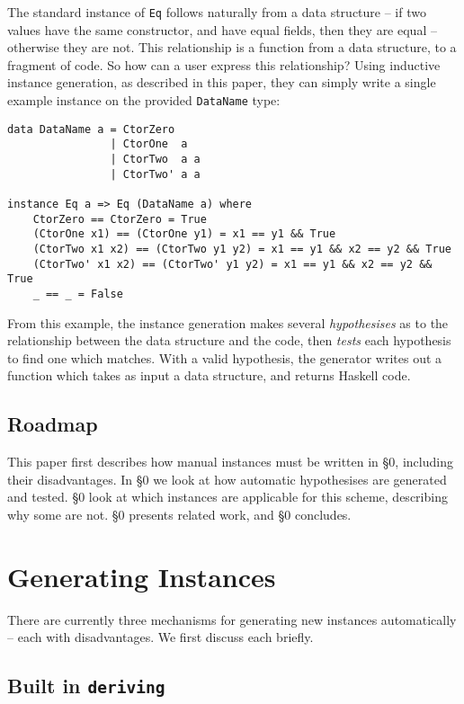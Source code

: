 \documentclass{llncs}
\newcommand{\T}[1]{\texttt{#1}}
\begin{document}
The standard instance of \T{Eq} follows naturally from a data structure -- if two values have the same constructor, and have equal fields, then they are equal -- otherwise they are not. This relationship is a function from a data structure, to a fragment of code. So how can a user express this relationship? Using inductive instance generation, as described in this paper, they can simply write a single example instance on the provided \T{DataName} type:

\begin{verbatim}
data DataName a = CtorZero
                | CtorOne  a
                | CtorTwo  a a
                | CtorTwo' a a

instance Eq a => Eq (DataName a) where
    CtorZero == CtorZero = True
    (CtorOne x1) == (CtorOne y1) = x1 == y1 && True
    (CtorTwo x1 x2) == (CtorTwo y1 y2) = x1 == y1 && x2 == y2 && True
    (CtorTwo' x1 x2) == (CtorTwo' y1 y2) = x1 == y1 && x2 == y2 && True
    _ == _ = False
\end{verbatim}

From this example, the instance generation makes several \textit{hypothesises} as to the relationship between the data structure and the code, then \textit{tests} each hypothesis to find one which matches. With a valid hypothesis, the generator writes out a function which takes as input a data structure, and returns Haskell code.

\subsection{Roadmap}

This paper first describes how manual instances must be written in \S0, including their disadvantages. In \S0 we look at how automatic hypothesises are generated and tested. \S0 look at which instances are applicable for this scheme, describing why some are not. \S0 presents related work, and \S0 concludes.


\section{Generating Instances}

There are currently three mechanisms for generating new instances automatically -- each with disadvantages. We first discuss each briefly.

\subsection{Built in \T{deriving}}
\end{document}
